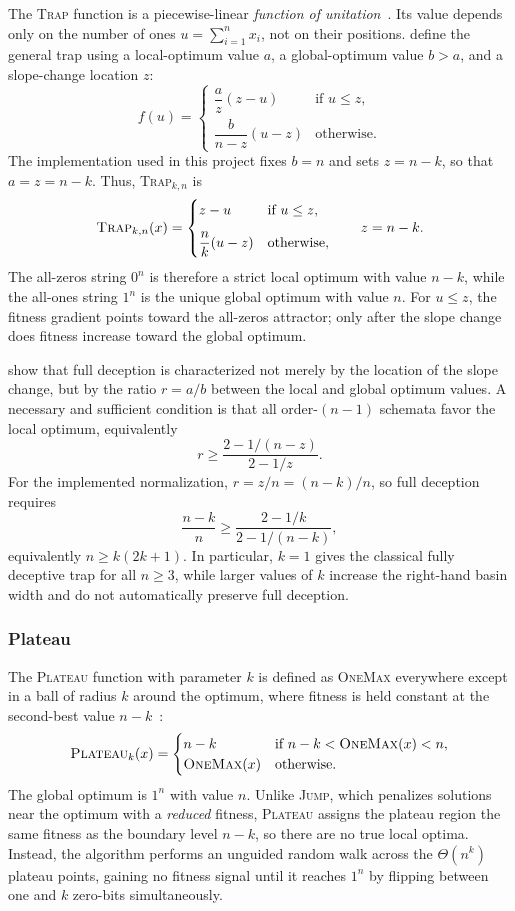 The \textsc{Trap} function is a piecewise-linear \textit{function of
unitation}~\cite{deb1993analyzing}. Its value depends only on the number of ones
$u = \sum_{i=1}^n x_i$, not on their positions. \citet{deb1993analyzing} define
the general trap using a local-optimum value $a$, a global-optimum value
$b>a$, and a slope-change location $z$:
\[
  f(u) =
  \begin{cases}
    \dfrac{a}{z}(z-u) & \text{if } u \leq z, \\[8pt]
    \dfrac{b}{n-z}(u-z) & \text{otherwise.}
  \end{cases}
\]
The implementation used in this project fixes $b=n$ and sets
$z=n-k$, so that $a=z=n-k$. Thus, \textsc{Trap}$_{k,n}$ is
\[
  \textsc{Trap}_{k,n}(x) =
  \begin{cases}
    z-u & \text{if } u \leq z, \\[8pt]
    \dfrac{n}{k}(u-z) & \text{otherwise,}
  \end{cases}
  \qquad z=n-k .
\]
The all-zeros string $0^n$ is therefore a strict local optimum with
value $n-k$, while the all-ones string $1^n$ is the unique global
optimum with value $n$. For $u \leq z$, the fitness gradient points
toward the all-zeros attractor; only after the slope change does
fitness increase toward the global optimum.

\citet{deb1993analyzing} show that full deception is characterized not merely
by the location of the slope change, but by the ratio
$r=a/b$ between the local and global optimum values. A necessary and
sufficient condition is that all order-$(n-1)$ schemata favor the local
optimum, equivalently
\[
  r \geq
  \frac{2 - 1/(n-z)}{2 - 1/z}.
\]
For the implemented normalization, $r=z/n=(n-k)/n$, so full deception
requires
\[
  \frac{n-k}{n}
  \geq
  \frac{2 - 1/k}{2 - 1/(n-k)},
\]
equivalently $n \geq k(2k+1)$. In particular, $k=1$ gives the classical
fully deceptive trap for all $n \geq 3$, while larger values of $k$
increase the right-hand basin width and do not automatically preserve
full deception.

\subsubsection{Plateau}

The \textsc{Plateau} function with parameter $k$ is defined as
\textsc{OneMax} everywhere except in a ball of radius $k$ around the
optimum, where fitness is held constant at the second-best value
$n - k$~\cite{antipov2021precise}:
\[
  \textsc{Plateau}_k(x) =
  \begin{cases}
    n - k & \text{if } n - k < \textsc{OneMax}(x) < n, \\
    \textsc{OneMax}(x) & \text{otherwise.}
  \end{cases}
\]
The global optimum is $1^n$ with value $n$. Unlike \textsc{Jump},
which penalizes solutions near the optimum with a \emph{reduced}
fitness, \textsc{Plateau} assigns the plateau region the same
fitness as the boundary level $n - k$, so there are no true local
optima. Instead, the algorithm performs an unguided random walk
across the $\Theta(n^k)$ plateau points, gaining no fitness signal
until it reaches $1^n$ by flipping between one and $k$ zero-bits
simultaneously.

